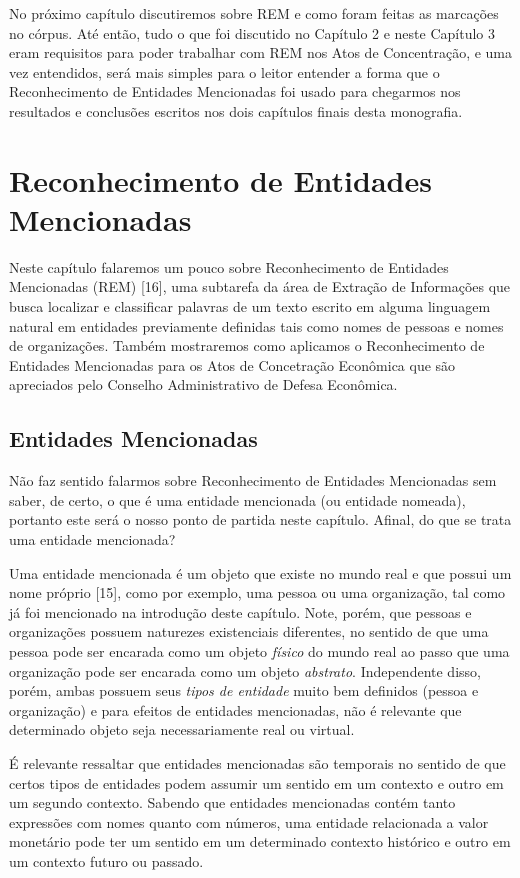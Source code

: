 \documentclass[11pt]{report}
\begin{document}
No próximo capítulo discutiremos sobre REM e como foram feitas as marcações no córpus. Até então, tudo o que foi discutido no Capítulo 2 e neste Capítulo 3 eram
requisitos para poder trabalhar com REM nos Atos de Concentração, e uma vez entendidos, será mais simples para o leitor entender a forma que o Reconhecimento de Entidades
Mencionadas foi usado para chegarmos nos resultados e conclusões escritos nos dois capítulos finais desta monografia.

\pagebreak
\chapter{Reconhecimento de Entidades Mencionadas}

\indent\indent Neste capítulo falaremos um pouco sobre Reconhecimento de Entidades Mencionadas (REM) [16], uma subtarefa da área de Extração de Informações que busca localizar e classificar
palavras de um texto escrito em alguma linguagem natural em entidades previamente definidas tais como nomes de pessoas e nomes de organizações. Também mostraremos como
aplicamos o Reconhecimento de Entidades Mencionadas para os Atos de Concetração Econômica que são apreciados pelo Conselho Administrativo de Defesa Econômica.

\section{Entidades Mencionadas}

\indent\indent Não faz sentido falarmos sobre Reconhecimento de Entidades Mencionadas sem saber, de certo, o que é uma entidade mencionada (ou entidade nomeada), portanto este
será o nosso ponto de partida neste capítulo. Afinal, do que se trata uma entidade mencionada?

Uma entidade mencionada é um objeto que existe no mundo real e que possui um nome próprio [15], como por exemplo, uma pessoa ou uma organização, tal como já foi mencionado na introdução
deste capítulo. Note, porém, que pessoas e organizações possuem naturezes existenciais diferentes, no sentido de que uma pessoa pode ser encarada como um objeto \textit{físico} do mundo real
ao passo que uma organização pode ser encarada como um objeto \textit{abstrato}. Independente disso, porém, ambas possuem seus \textit{tipos de entidade} muito bem definidos
(pessoa e organização) e para efeitos de entidades mencionadas, não é relevante que determinado objeto seja necessariamente real ou virtual.

É relevante ressaltar que entidades mencionadas são temporais no sentido de que certos tipos de entidades podem assumir um sentido em um contexto e outro em um segundo contexto.
Sabendo que entidades mencionadas contém tanto expressões com nomes quanto com números, uma entidade relacionada a valor monetário pode ter um sentido em um determinado
contexto histórico e outro em um contexto futuro ou passado.
\end{document}
